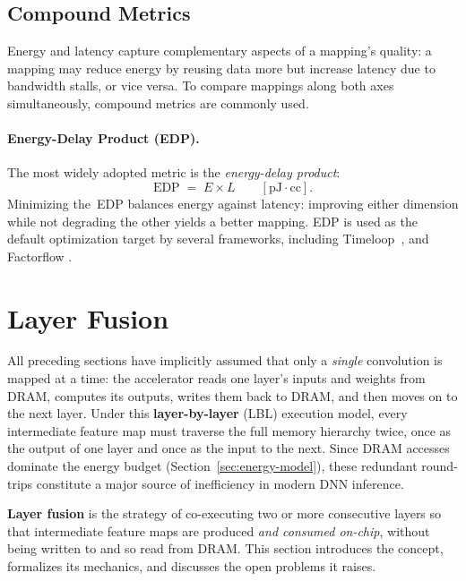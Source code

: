 \subsection{Compound Metrics}
\label{sec:compound-metrics}

Energy and latency capture complementary aspects of a mapping's quality:
a mapping may reduce energy by reusing data more but increase latency due
to bandwidth stalls, or vice versa.
To compare mappings along both axes simultaneously, compound metrics are
commonly used.

\paragraph{Energy-Delay Product (EDP).}
The most widely adopted metric is the \emph{energy-delay product}:
\begin{equation}
\label{eq:edp}
\text{EDP} \;=\; E \times L \qquad [\text{pJ}\cdot\text{cc}].
\end{equation}
Minimizing the~EDP balances energy against latency: improving either
dimension while not degrading the other yields a better mapping.
EDP is used as the default optimization target by several frameworks,
including Timeloop~\cite{parashar2019timeloop}, and Factorflow \cite{Factorflow} .


\section{Layer Fusion}
\label{sec:bg-layer-fusion}

All preceding sections have implicitly assumed that only a
\emph{single} convolution is mapped at a time: the
accelerator reads one layer's inputs and weights from DRAM, computes
its outputs, writes them back to DRAM, and then moves on to the next
layer.
Under this \textbf{layer-by-layer} (LBL) execution model, every
intermediate feature map must traverse the full memory hierarchy twice, once
as the output of one layer and once as the input to the next.
Since DRAM accesses dominate the energy budget
(Section~\ref{sec:energy-model}), these redundant round-trips constitute a
major source of inefficiency in modern DNN inference.

\textbf{Layer fusion} is the strategy of co-executing two or more
consecutive layers so that intermediate feature maps are produced
\emph{and consumed on-chip}, without being written to and so read from DRAM.
This section introduces the concept, formalizes its mechanics, and
discusses the open problems it raises.

